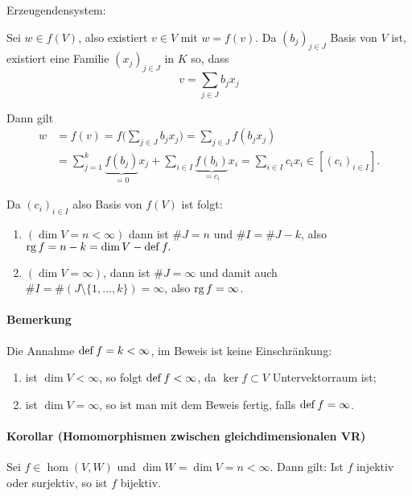  		Erzeugendensystem:
 		\begin{addmargin}[25pt]{0pt}
 			Sei $w\in f(V)$, also existiert $v\in V$ mit $w = f(v)$. Da $(b_j)_{j\in J}$ Basis von $V$ ist, existiert eine Familie $(x_j)_{j\in J}$ in $K$ so, dass
 			\begin{equation*}
 				v = \sum_{j\in J} b_jx_j
 			\end{equation*}

 			Dann gilt
 			\begin{align*}
 				w & = f(v) = f\Big(\sum_{j\in J} b_jx_j\Big) = \sum_{j\in J}f(b_jx_j)                                                                  \\
 				  & = \sum_{j=1}^{k}\underbrace{f(b_j)}_{=0}x_j + \sum_{i\in I}\underbrace{f(b_i)}_{=c_i}x_i = \sum_{i\in I}c_ix_i\in[(c_i)_{i\in I}].
 			\end{align*}
 		\end{addmargin}

 		Da $(c_i)_{i\in I}$ also Basis von $f(V)$ ist folgt:
 		\begin{enumerate}[1.{ Fall:}]
 			\item $(\dim V = n<\infty)$ dann ist $\# J = n$ und $\# I = \# J-k$, also $\operatorname{rg} f = n-k = \dim V - \operatorname{def} f.$
 			\item $(\dim V = \infty)$, dann ist $\# J = \infty $ und damit auch $\#I =\#(J\setminus \{{1,...,k\}})=\infty $, also $\operatorname{rg} f= \infty$.
 		\end{enumerate}

 	\paragraph{Bemerkung}
 		Die Annahme $\operatorname{def} f = k<\infty$, im Beweis ist keine Einschränkung:
 		\begin{enumerate}
 			\item ist $\dim V < \infty$, so folgt $\operatorname{def} f<\infty$, da $\ker f\subset V$ Untervektorraum ist;
 			\item ist $\dim V = \infty$, so ist man mit dem Beweis fertig, falls $\operatorname{def} f = \infty$.
 		\end{enumerate}

 	\paragraph{Korollar (Homomorphismen zwischen gleichdimensionalen VR)}
 		\begin{Korollar}
 			Sei $f\in \hom(V,W)$ und $\dim W = \dim V = n<\infty$.
 			Dann gilt: Ist $f$ injektiv oder surjektiv, so ist $f$ bijektiv.
 		\end{Korollar}

